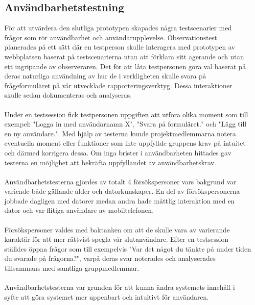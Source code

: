 \documentclass[12pt]{article}
\begin{document}
\subsection{Användbarhetstestning}
För att utvärdera den slutliga prototypen skapades några testscenarier med frågor som rör användbarhet och användarupplevelse. Observationstest planerades på ett sätt där en testperson skulle interagera med prototypen av webbplatsen baserat på testscenarierna utan att förklara sitt agerande och utan ett ingripande av observeraren. Det för att låta testpersonen göra val baserat på deras naturliga användning av hur de i verkligheten skulle svara på frågeformuläret på vår utvecklade rapporteringsverktyg. Dessa interaktioner skulle sedan dokumenteras och analyseras.\\\\
Under en testsession fick testpersonen uppgiften att utföra olika moment som till exempel: "Logga in med användarnamn X", "Svara på formuläret." och "Lägg till en ny användare.". Med hjälp av testerna kunde projektmedlemmarna notera eventuella moment eller funktioner som inte uppfyllde gruppens krav på intuitet och därmed korrigera dessa. Om inga brister i användbarheten hittades gav testerna en möjlighet att bekräfta uppfyllandet av användbarhetskrav.\\\\

Användbarhetstesterna gjordes av totalt 4 försökspersoner vars bakgrund var variende både gällande ålder och datorkunskaper. En del av försökspersonerna jobbade dagligen med datorer medan andra hade måttlig interaktion med en dator och var flitiga användare av mobiltelefonen. \\\\
Försökspersoner valdes med baktanken om att de skulle vara av varierande karaktär för att mer rättvist spegla vår slutanvändare. Efter en testsession ställdes öppna frågor som till exempelvis "Var det något du tänkte på under tiden du svarade på frågorna?", varpå deras svar noterades och analyserades tillsammans med samtliga gruppmedlemmar.\\\\
Användbarhetstesterna var grunden för att kunna ändra systemets innehåll i syfte att göra systemet mer uppenbart och intuitivt för användaren.
\end{document}
